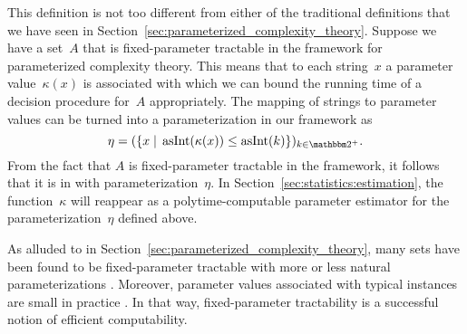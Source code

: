 This definition is not too different from either of the traditional definitions that we have seen in Section~\ref{sec:parameterized_complexity_theory}.
Suppose we have a set~$A$ that is fixed-parameter tractable in the \citeauthor{flum2006parameterized} framework for parameterized complexity theory.
This means that to each string~$x$ a parameter value~$\kappa(x)$ is associated with which we can bound the running time of a decision procedure for~$A$ appropriately.
The mapping of strings to parameter values can be turned into a parameterization in our framework as
\begin{equation}
\label{eq:flum_parameterization}
  \eta \deq (\{x \st \asNat(\kappa(x)) \le \asNat(k)\})_{k \in \binary^+}. \notag
\end{equation}
From the fact that $A$ is fixed-parameter tractable in the \citeauthor{flum2006parameterized} framework, it follows that it is in  with parameterization~$\eta$.
In Section~\ref{sec:statistics:estimation}, the function~$\kappa$ will reappear as a polytime-computable parameter estimator for the parameterization~$\eta$ defined above.

As alluded to in Section~\ref{sec:parameterized_complexity_theory}, many sets have been found to be fixed-parameter tractable with more or less natural parameterizations \parencite{downey1995fixed,niedermeier2006invitation,cygan2015parameterized}.
Moreover, parameter values associated with typical instances are small in practice \parencite{downey1999framework,downey1999parameterized}.
In that way, fixed-parameter tractability is a successful notion of efficient computability.

